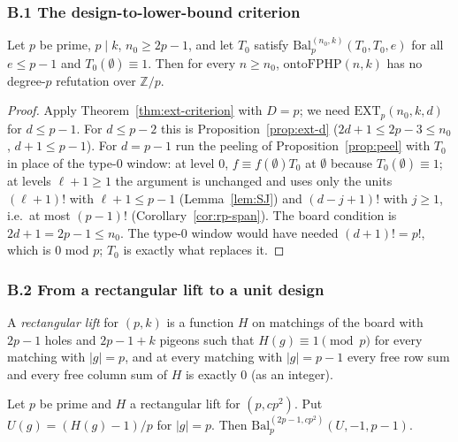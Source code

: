 \subsubsection*{B.1 The design-to-lower-bound criterion}

\begin{theorem}\label{thm:B-criterion}
Let $p$ be prime, $p\mid k$, $n_0\ge2p-1$, and let $T_0$ satisfy
$\mathrm{Bal}^{(n_0,k)}_p(T_0,T_0,e)$ for all $e\le p-1$ and $T_0(\emptyset)\equiv1$.
Then for every $n\ge n_0$, $\mathrm{ontoFPHP}(n,k)$ has no degree-$p$ refutation
over $\mathbb Z/p$.
\end{theorem}

\begin{proof}
Apply Theorem~\ref{thm:ext-criterion} with $D=p$; we need
$\mathrm{EXT}_p(n_0,k,d)$ for $d\le p-1$.  For $d\le p-2$ this is
Proposition~\ref{prop:ext-d} ($2d+1\le2p-3\le n_0$, $d+1\le p-1$).  For $d=p-1$ run
the peeling of Proposition~\ref{prop:peel} with $T_0$ in place of the type-$0$
window: at level $0$, $f\equiv f(\emptyset)T_0$ at $\emptyset$ because
$T_0(\emptyset)\equiv1$; at levels $\ell+1\ge1$ the argument is unchanged and uses
only the units $(\ell+1)!$ with $\ell+1\le p-1$ (Lemma~\ref{lem:SJ}) and
$(d-j+1)!$ with $j\ge1$, i.e.\ at most $(p-1)!$
(Corollary~\ref{cor:rp-span}).
The board condition is $2d+1=2p-1\le n_0$.  The type-$0$ window would have needed
$(d+1)!=p!$, which is $0$ mod $p$; $T_0$ is exactly what replaces it.
\end{proof}

\subsubsection*{B.2 From a rectangular lift to a unit design}

\begin{definition}\label{def:rect-lift}
A \emph{rectangular lift} for $(p,k)$ is a function $H$ on matchings of the board
with $2p-1$ holes and $2p-1+k$ pigeons such that $H(g)\equiv1\pmod p$ for every
matching with $|g|=p$, and at every matching with $|g|=p-1$ every free row sum and
every free column sum of $H$ is exactly $0$ (as an
integer).
\end{definition}

\begin{lemma}\label{lem:top}
Let $p$ be prime and $H$ a rectangular lift for $(p,cp^2)$.  Put $U(g)=(H(g)-1)/p$ for
$|g|=p$.  Then $\mathrm{Bal}^{(2p-1,cp^2)}_p(U,-1,p-1)$.
\end{lemma}

